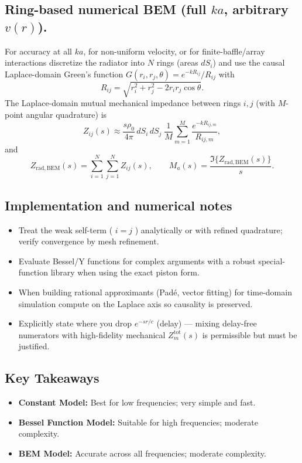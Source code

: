 \subsection{Ring-based numerical BEM (full \(ka\), arbitrary \(v(r)\)).}
For accuracy at all \(ka\), for non-uniform velocity, or for finite-baffle/array interactions discretize the radiator into \(N\) rings (areas \(dS_i\)) and use the causal Laplace-domain Green's function \(G(r_i,r_j,\theta)=e^{-kR_{ij}}/R_{ij}\) with
\[
R_{ij}=\sqrt{r_i^2+r_j^2-2r_ir_j\cos\theta}.
\]
The Laplace-domain mutual mechanical impedance between rings \(i,j\) (with \(M\)-point angular quadrature) is
\[
Z_{ij}(s)\approx\frac{s\rho_0}{4\pi}\,dS_i\,dS_j\;\frac{1}{M}\sum_{m=1}^M\frac{e^{-kR_{ij,m}}}{R_{ij,m}},
\]
and
\[
Z_{\mathrm{rad,BEM}}(s)=\sum_{i=1}^N\sum_{j=1}^N Z_{ij}(s),\qquad
M_a(s)=\frac{\Im\{Z_{\mathrm{rad,BEM}}(s)\}}{s}.
\]

\subsection{Implementation and numerical notes}
\begin{itemize}
  \item Treat the weak self-term ( \(i=j\) ) analytically or with refined quadrature; verify convergence by mesh refinement.  
  \item Evaluate Bessel/Y functions for complex arguments with a robust special-function library when using the exact piston form.  
  \item When building rational approximants (Padé, vector fitting) for time-domain simulation compute on the Laplace axis so causality is preserved.  
  \item Explicitly state where you drop \(e^{-s r/c}\) (delay) — mixing delay-free numerators with high-fidelity mechanical \(Z_m^{\mathrm{tot}}(s)\) is permissible but must be justified.
\end{itemize}

\subsection{Key Takeaways}
\begin{itemize}
    \item \textbf{Constant Model:} Best for low frequencies; very simple and fast.
    \item \textbf{Bessel Function Model:} Suitable for high frequencies; moderate complexity.
    \item \textbf{BEM Model:} Accurate across all frequencies; moderate complexity.
\end{itemize}





